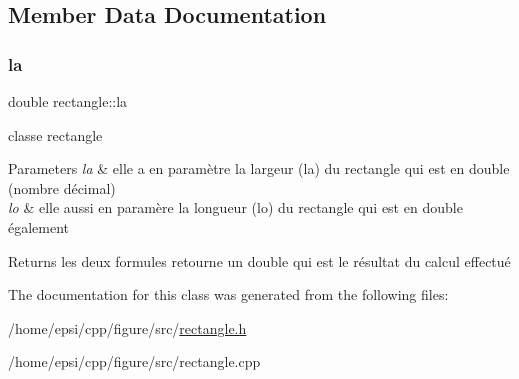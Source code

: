 \subsection{Member Data Documentation}
\mbox{\label{classrectangle_a1aa627f392f0467633d9dcd2128b8742}} 
\subsubsection{\texorpdfstring{la}{la}}
{\footnotesize\ttfamily double rectangle\+::la}



classe rectangle 


\begin{DoxyParams}{Parameters}
{\em la} & elle a en paramètre la largeur (la) du rectangle qui est en double (nombre décimal) \\
\hline
{\em lo} & elle aussi en paramère la longueur (lo) du rectangle qui est en double également \\
\hline
\end{DoxyParams}
\begin{DoxyReturn}{Returns}
les deux formules retourne un double qui est le résultat du calcul effectué 
\end{DoxyReturn}


The documentation for this class was generated from the following files\+:\begin{DoxyCompactItemize}
\item 
/home/epsi/cpp/figure/src/\hyperlink{rectangle_8h}{rectangle.\+h}\item 
/home/epsi/cpp/figure/src/rectangle.\+cpp\end{DoxyCompactItemize}
